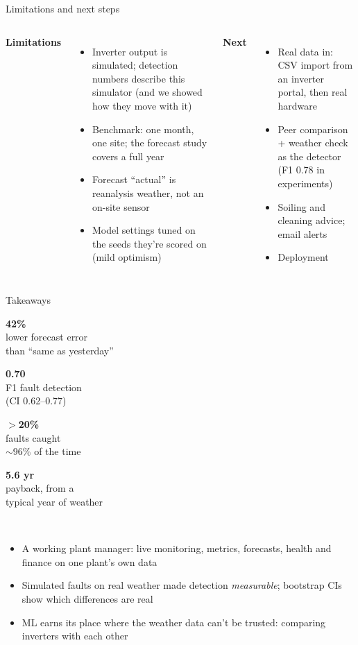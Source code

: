 \documentclass[aspectratio=169,10pt]{beamer}
\newcommand{\bignum}[2]{\begin{minipage}[t]{0.23\textwidth}\centering
  {\color{sun}\fontsize{22}{24}\selectfont\bfseries #1}\\[0.3em]{\color{muted}\footnotesize #2}\end{minipage}}
\begin{document}
\begin{frame}{Limitations and next steps}
  \begin{columns}[T]
    \textbf{Limitations}
    \begin{itemize}\small\setlength\itemsep{0.4em}
      \item Inverter output is simulated; detection numbers describe this simulator (and we showed how they move with it)
      \item Benchmark: one month, one site; the forecast study covers a full year
      \item Forecast ``actual'' is reanalysis weather, not an on-site sensor
      \item Model settings tuned on the seeds they're scored on (mild optimism)
    \end{itemize}
    \textbf{Next}
    \begin{itemize}\small\setlength\itemsep{0.4em}
      \item Real data in: CSV import from an inverter portal, then real hardware
      \item Peer comparison + weather check as the detector (F1 0.78 in experiments)
      \item Soiling and cleaning advice; email alerts
      \item Deployment
    \end{itemize}
  \end{columns}
\end{frame}

\begin{frame}{Takeaways}
  \vspace{0.8em}
  \centering
  \bignum{42\%}{lower forecast error\\than ``same as yesterday''}\hfill
  \bignum{0.70}{F1 fault detection\\(CI 0.62--0.77)}\hfill
  \bignum{$>$20\%}{faults caught\\$\sim$96\% of the time}\hfill
  \bignum{5.6 yr}{payback, from a\\typical year of weather}\\[1.8em]
  \raggedright
  \begin{itemize}\setlength\itemsep{0.5em}
    \item A working plant manager: live monitoring, metrics, forecasts, health and finance on one plant's own data
    \item Simulated faults on real weather made detection \emph{measurable}; bootstrap CIs show which differences are real
    \item ML earns its place where the weather data can't be trusted: comparing inverters with each other
  \end{itemize}
  \vspace{1em}
\end{frame}
\end{document}
